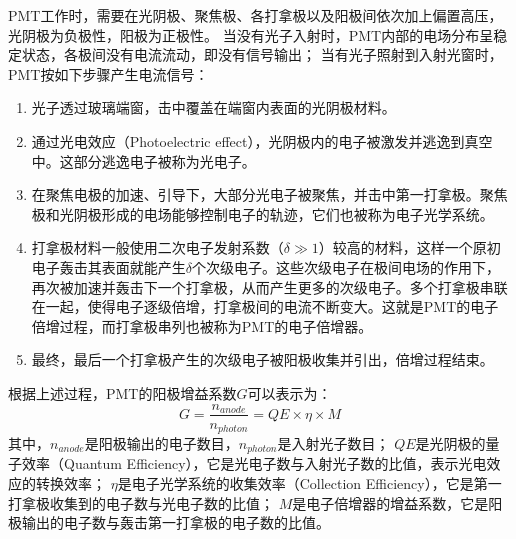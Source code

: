 PMT工作时，需要在光阴极、聚焦极、各打拿极以及阳极间依次加上偏置高压，光阴极为负极性，阳极为正极性。
当没有光子入射时，PMT内部的电场分布呈稳定状态，各极间没有电流流动，即没有信号输出；
当有光子照射到入射光窗时，PMT按如下步骤产生电流信号：
\begin{enumerate}
	\item 光子透过玻璃端窗，击中覆盖在端窗内表面的光阴极材料。
	\item 通过光电效应（Photoelectric effect），光阴极内的电子被激发并逃逸到真空中。这部分逃逸电子被称为光电子。
	\item 在聚焦电极的加速、引导下，大部分光电子被聚焦，并击中第一打拿极。聚焦极和光阴极形成的电场能够控制电子的轨迹，它们也被称为电子光学系统。
	\item 打拿极材料一般使用二次电子发射系数（$\delta\gg1$）较高的材料，这样一个原初电子轰击其表面就能产生$\delta$个次级电子。这些次级电子在极间电场的作用下，再次被加速并轰击下一个打拿极，从而产生更多的次级电子。多个打拿极串联在一起，使得电子逐级倍增，打拿极间的电流不断变大。这就是PMT的电子倍增过程，而打拿极串列也被称为PMT的电子倍增器。
	\item 最终，最后一个打拿极产生的次级电子被阳极收集并引出，倍增过程结束。%
\end{enumerate}

根据上述过程，PMT的阳极增益系数$G$可以表示为：
\begin{equation}
G = \frac{n_{anode}}{n_{photon}} = QE \times \eta \times M
\label{eq:ch2:pmt_gain}
\end{equation}
其中，$n_{anode}$是阳极输出的电子数目，$n_{photon}$是入射光子数目；
$QE$是光阴极的量子效率（Quantum Efficiency），它是光电子数与入射光子数的比值，表示光电效应的转换效率；
$\eta$是电子光学系统的收集效率（Collection Efficiency），它是第一打拿极收集到的电子数与光电子数的比值；
$M$是电子倍增器的增益系数，它是阳极输出的电子数与轰击第一打拿极的电子数的比值。

